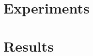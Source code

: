 \documentclass[10pt,twocolumn,letterpaper]{article}
\begin{document}
\section{Experiments}




\section{Results}




{\small


}
\end{document}
